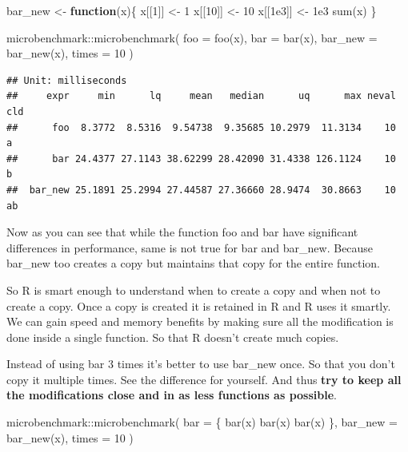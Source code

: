 \documentclass[
]{book}
\newenvironment{Shaded}{\begin{snugshade}}{\end{snugshade}}
\newcommand{\AttributeTok}[1]{\textcolor[rgb]{0.77,0.63,0.00}{#1}}
\newcommand{\ControlFlowTok}[1]{\textcolor[rgb]{0.13,0.29,0.53}{\textbf{#1}}}
\newcommand{\DecValTok}[1]{\textcolor[rgb]{0.00,0.00,0.81}{#1}}
\newcommand{\FloatTok}[1]{\textcolor[rgb]{0.00,0.00,0.81}{#1}}
\newcommand{\FunctionTok}[1]{\textcolor[rgb]{0.00,0.00,0.00}{#1}}
\newcommand{\NormalTok}[1]{#1}
\newcommand{\OtherTok}[1]{\textcolor[rgb]{0.56,0.35,0.01}{#1}}
\newcommand{\SpecialCharTok}[1]{\textcolor[rgb]{0.00,0.00,0.00}{#1}}
\begin{document}
\begin{Shaded}
\begin{Highlighting}[]
\NormalTok{bar\_new }\OtherTok{\textless{}{-}} \ControlFlowTok{function}\NormalTok{(x)\{}
\NormalTok{  x[[}\DecValTok{1}\NormalTok{]] }\OtherTok{\textless{}{-}} \DecValTok{1}
\NormalTok{  x[[}\DecValTok{10}\NormalTok{]] }\OtherTok{\textless{}{-}} \DecValTok{10}
\NormalTok{  x[[}\FloatTok{1e3}\NormalTok{]] }\OtherTok{\textless{}{-}} \FloatTok{1e3}
  \FunctionTok{sum}\NormalTok{(x)}
\NormalTok{\}}

\NormalTok{microbenchmark}\SpecialCharTok{::}\FunctionTok{microbenchmark}\NormalTok{(}
  \AttributeTok{foo =} \FunctionTok{foo}\NormalTok{(x),}
  \AttributeTok{bar =} \FunctionTok{bar}\NormalTok{(x),}
  \AttributeTok{bar\_new =} \FunctionTok{bar\_new}\NormalTok{(x),}
  \AttributeTok{times =} \DecValTok{10}
\NormalTok{)}
\end{Highlighting}
\end{Shaded}

\begin{verbatim}
## Unit: milliseconds
##     expr     min      lq     mean   median      uq      max neval cld
##      foo  8.3772  8.5316  9.54738  9.35685 10.2979  11.3134    10  a 
##      bar 24.4377 27.1143 38.62299 28.42090 31.4338 126.1124    10   b
##  bar_new 25.1891 25.2994 27.44587 27.36660 28.9474  30.8663    10  ab
\end{verbatim}

Now as you can see that while the function foo and bar have significant differences in performance, same is not true for bar and bar\_new. Because bar\_new too creates a copy but maintains that copy for the entire function.

So R is smart enough to understand when to create a copy and when not to create a copy. Once a copy is created it is retained in R and R uses it smartly. We can gain speed and memory benefits by making sure all the modification is done inside a single function. So that R doesn't create much copies.

Instead of using bar 3 times it's better to use bar\_new once. So that you don't copy it multiple times. See the difference for yourself. And thus \textbf{try to keep all the modifications close and in as less functions as possible}.

\begin{Shaded}
\begin{Highlighting}[]
\NormalTok{microbenchmark}\SpecialCharTok{::}\FunctionTok{microbenchmark}\NormalTok{(}
  \AttributeTok{bar =}\NormalTok{ \{}
    \FunctionTok{bar}\NormalTok{(x)}
    \FunctionTok{bar}\NormalTok{(x)}
    \FunctionTok{bar}\NormalTok{(x)}
\NormalTok{    \},}
  \AttributeTok{bar\_new =} \FunctionTok{bar\_new}\NormalTok{(x),}
  \AttributeTok{times =} \DecValTok{10}
\NormalTok{)}
\end{Highlighting}
\end{Shaded}
\end{document}
